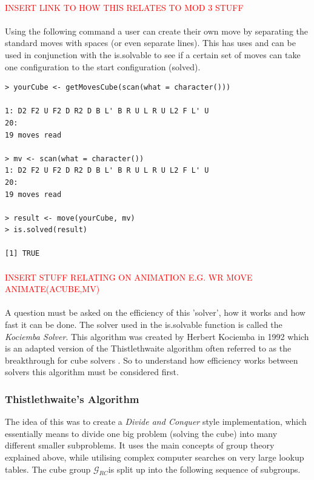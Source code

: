 \documentclass{article}
\begin{document}
\paragraph*{}
\textcolor{red}{INSERT LINK TO HOW THIS RELATES TO MOD 3 STUFF}
\paragraph*{}
Using the following command a user can create their own move by separating the standard moves with spaces (or even separate lines). This has uses and can be used in conjunction with the is.solvable to see if a certain set of moves can take one configuration to the start configuration (solved).
\begin{lstlisting}
> yourCube <- getMovesCube(scan(what = character()))

1: D2 F2 U F2 D R2 D B L' B R U L R U L2 F L' U
20:
19 moves read

> mv <- scan(what = character())
1: D2 F2 U F2 D R2 D B L' B R U L R U L2 F L' U
20:
19 moves read

> result <- move(yourCube, mv)
> is.solved(result)

[1] TRUE
\end{lstlisting}
\paragraph*{}
\textcolor{red}{INSERT STUFF RELATING ON ANIMATION E.G. WR MOVE ANIMATE(ACUBE,MV)}
\paragraph*{}

A question must be asked on the efficiency of this 'solver', how it works and how fast it can be done. 
The solver used in the is.solvable function is called the \textit{Kociemba Solver}. This algorithm was created by Herbert Kociemba in 1992 which is an adapted version of the Thistlethwaite algorithm often referred to as the breakthrough for cube solvers \cite{Thistlethwaite}. So to understand how efficiency works between solvers this algorithm must be considered first.

\subsubsection*{Thistlethwaite's Algorithm}

The idea of this was to create a \textit{Divide and Conquer} style implementation, which essentially means to divide one big problem (solving the cube) into many different smaller subproblems. It uses the main concepts of group theory explained above, while utilising complex computer searches on very large lookup tables. 
The cube group $\mathcal{G}_{RC}$is split up into the following sequence of subgroups.  
\end{document}
